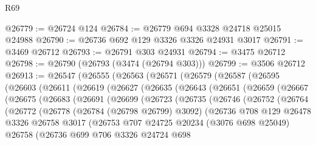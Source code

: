 \begin{lexlean}{R69}
\begin{coremodule}
@26779 := @26724 @124
@26784 := @26779 @694 @3328 @24718 @25015 @24988
@26790 := @26736 @692 @129 @3326 @3326 @24931 @3017
@26791 := @3469 @26712
@26793 := @26791 @303 @24931
@26794 := @3475 @26712
@26798 := @26790 (@26793 (@3474 (@26794 @303)))
@26799 := @3506 @26712
@26913 := @26547
    (@26555
      (@26563
        (@26571
          (@26579
            (@26587
              (@26595
                (@26603
                  (@26611
                    (@26619
                      (@26627
                        (@26635
                          (@26643
                            (@26651
                              (@26659
                                (@26667
                                  (@26675
                                    (@26683
                                      (@26691
                                        (@26699
                                          (@26723
                                            (@26735
                                              (@26746
                                                (@26752
                                                  (@26764
                                                    (@26772
                                                      (@26778
                                                        (@26784 (@26798 @26799) @3092)
                                                        (@26736
                                                          @708
                                                          @129
                                                          @26478
                                                          @3326
                                                          @26758
                                                          @3017
                                                          (@26753
                                                            @707
                                                            @24725
                                                            @20234
                                                            (@3076 @698 @25049)
                                                            @26758
                                                            (@26736
                                                              @699
                                                              @706
                                                              @3326
                                                              @24724
                                                              @698

\end{coremodule}
\end{lexlean}
